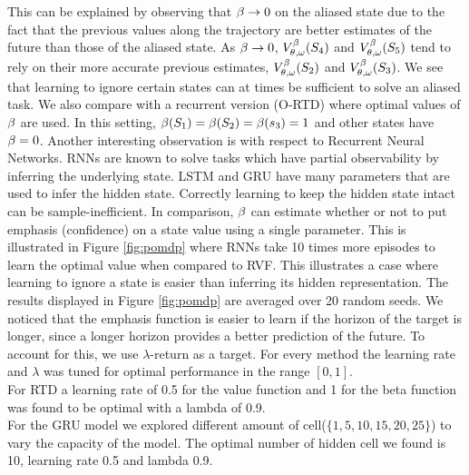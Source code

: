  This can be explained by observing that $\beta \rightarrow 0$ on the aliased state due to the fact that the previous values along the trajectory are better estimates of the future than those of the aliased state. As $\beta \to 0$, $V^{\beta}_{\theta, \omega}(S_4)$ and $V^{\beta}_{\theta, \omega}(S_5)$ tend to rely on their more accurate previous estimates, $V^{\beta}_{\theta, \omega}(S_2)$ and $V^{\beta}_{\theta, \omega}(S_3)$. We see that learning to ignore certain states can at times be sufficient to solve an aliased task. We also compare with a recurrent version (O-RTD) where optimal values of $\beta$ are used. In this setting,  $\beta(S_1)=\beta(S_2) = \beta(s_3) = 1 $ and other states have $\beta = 0$. Another interesting observation is with respect to Recurrent Neural Networks. RNNs are known to solve tasks which have partial observability by inferring the underlying state. LSTM and GRU have many parameters that are used to infer the hidden state. Correctly learning to keep the hidden state intact can be sample-inefficient. In comparison, $\beta$ can estimate whether or not to put emphasis (confidence) on a state value using a single parameter. This is illustrated in Figure \ref{fig:pomdp} where RNNs take 10 times more episodes to learn the optimal value when compared to RVF. This illustrates a case where learning to ignore a state is easier than inferring its hidden representation. The results displayed in Figure \ref{fig:pomdp} are averaged over 20 random seeds.  We noticed that the emphasis function is easier to learn if the horizon of the target is longer, since a longer horizon provides a better prediction of the future. To account for this, we use $\lambda$-return as a target. For every method the learning rate and $\lambda$ was tuned for optimal performance in the range $[0,1]$.\\
For RTD a learning rate of 0.5 for the value function and 1 for the beta function was found to be optimal with a lambda of 0.9.\\
For the GRU model we explored different amount of cell($\{1,5,10,15,20,25\}$) to vary the capacity of the model. The optimal number of hidden cell we found is 10, learning rate 0.5 and lambda 0.9. 
